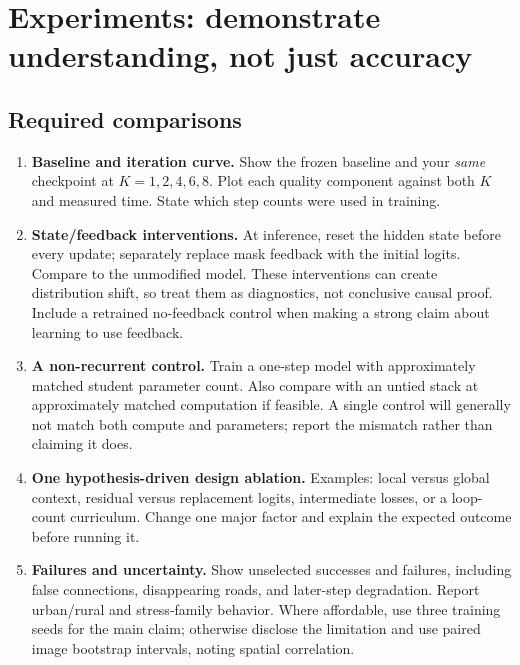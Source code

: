 \documentclass[11pt,letterpaper]{article}
\newcommand{\page}[1]{\clearpage\section{#1}}
\begin{document}
\page{Experiments: demonstrate understanding, not just accuracy}
\subsection{Required comparisons}
\begin{enumerate}
\item \textbf{Baseline and iteration curve.} Show the frozen baseline and your \emph{same} checkpoint at $K=1,2,4,6,8$. Plot each quality component against both $K$ and measured time. State which step counts were used in training.
\item \textbf{State/feedback interventions.} At inference, reset the hidden state before every update; separately replace mask feedback with the initial logits. Compare to the unmodified model. These interventions can create distribution shift, so treat them as diagnostics, not conclusive causal proof. Include a retrained no-feedback control when making a strong claim about learning to use feedback.
\item \textbf{A non-recurrent control.} Train a one-step model with approximately matched student parameter count. Also compare with an untied stack at approximately matched computation if feasible. A single control will generally not match both compute and parameters; report the mismatch rather than claiming it does.
\item \textbf{One hypothesis-driven design ablation.} Examples: local versus global context, residual versus replacement logits, intermediate losses, or a loop-count curriculum. Change one major factor and explain the expected outcome before running it.
\item \textbf{Failures and uncertainty.} Show unselected successes and failures, including false connections, disappearing roads, and later-step degradation. Report urban/rural and stress-family behavior. Where affordable, use three training seeds for the main claim; otherwise disclose the limitation and use paired image bootstrap intervals, noting spatial correlation.
\end{enumerate}
\end{document}

